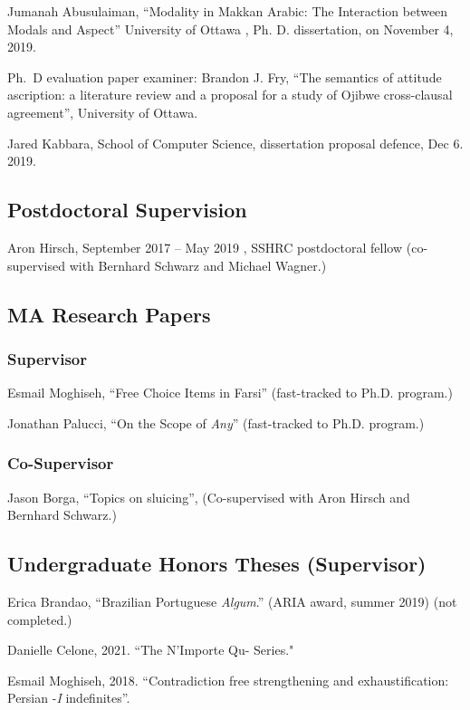 \documentclass[11pt]{article}
\begin{document}
Jumanah Abusulaiman, “Modality in Makkan Arabic: The Interaction between Modals and Aspect” University of Ottawa , Ph. D. dissertation, on November 4, 2019.

Ph.\ D evaluation paper examiner: Brandon J. Fry, ``The semantics of attitude ascription: a literature review and a proposal for a study of Ojibwe cross-clausal agreement'', University of Ottawa.

Jared Kabbara, School of Computer Science, dissertation proposal defence, Dec 6. 2019.


\subsection*{Postdoctoral Supervision}

Aron Hirsch, September 2017 -- May 2019 , SSHRC postdoctoral fellow (co-supervised with Bernhard Schwarz and Michael Wagner.)

\subsection*{MA Research Papers}

\subsubsection*{Supervisor}

Esmail Moghiseh, ``Free Choice Items in Farsi'' (fast-tracked to Ph.D. program.)

Jonathan Palucci, ``On the Scope of \textit{Any}'' (fast-tracked to Ph.D. program.)

\subsubsection*{Co-Supervisor}

Jason Borga, ``Topics on sluicing'', (Co-supervised with Aron Hirsch and Bernhard Schwarz.)

\subsection*{Undergraduate Honors Theses (Supervisor)}

Erica Brandao, ``Brazilian Portuguese \textit{Algum}.'' (ARIA award, summer 2019) (not completed.)

Danielle Celone, 2021. ``The N'Importe Qu- Series." 

Esmail Moghiseh, 2018. ``Contradiction free strengthening and exhaustification: Persian -\textit{I} indefinites''. 
\end{document}
